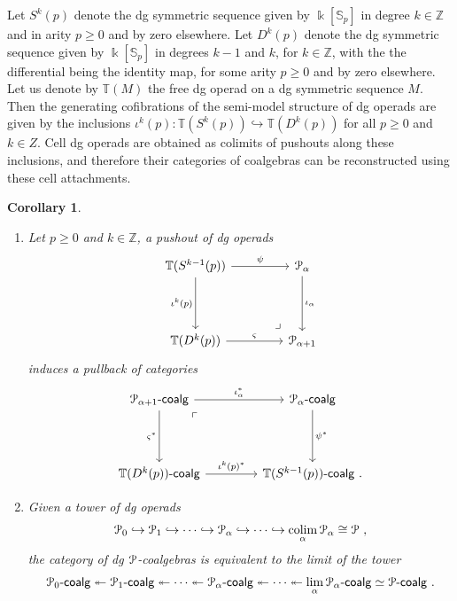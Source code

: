 \documentclass{proc-l}
\renewcommand{\mathcal}{\EuScript}
\DeclareMathOperator*{\colim}{colim}
\newcommand{\oneop}{\mathcal{P}}
\newcommand{\onecoalg}[1]{#1\text{-}\mathsf{coalg}}
\newcommand{\onepcoalg}{\mathcal{P}\text{-}\mathsf{coalg}}
\theoremstyle{plain}
\newtheorem{corollary}[{theorem}]{Corollary}
\theoremstyle{definition}
\theoremstyle{remark}
\newcommand{\kk}{\Bbbk}
\begin{document}
Let $S^{k}(p)$ denote the dg symmetric sequence given by $\kk[\mathbb{S}_p]$ in degree $k \in \mathbb{Z}$ and in arity $p \geq 0$ and by zero elsewhere. Let $D^k(p)$ denote the dg symmetric sequence given by $\kk[\mathbb{S}_p]$ in degrees $k-1$ and $k$, for $k \in \mathbb{Z}$, with the the differential being the identity map, for some arity $p \geq 0$ and by zero elsewhere. Let us denote by $\mathbb{T}(M)$ the free dg operad on a dg symmetric sequence $M$. Then the generating cofibrations of the semi-model structure of dg operads are given by the inclusions $\iota^k(p): \mathbb{T}(S^{k}(p)) \hookrightarrow \mathbb{T}(D^k(p))$ for all $p \geq 0$ and $k \in Z$. Cell dg operads are obtained as colimits of pushouts along these inclusions, and therefore their categories of coalgebras can be reconstructed using these cell attachments.

\begin{corollary}%
\label{Corollary:2.17}\label{corollary: devissage along cells of 1-categories of P-coalgebras}\leavevmode
\begin{enumerate}
\item Let $p \geq 0$ and $k \in \mathbb{Z}$, a pushout of dg operads
\[
\begin{tikzcd}[column sep=3.5pc,row sep=3.5pc]
\mathbb{T}(S^{k-1}(p)) \arrow[r,"\psi"] \arrow[d,"\iota^k(p)",swap]  \arrow[dr, phantom,"\ulcorner" rotate=-180, very near end]
&\oneop_\alpha \arrow[d,"\iota_\alpha"]  \\
\mathbb{T}(D^k(p)) \arrow[r,"\varsigma"]
&\oneop_{\alpha + 1}
\end{tikzcd}
\]
induces a pullback of categories
\[
\begin{tikzcd}[column sep=3.5pc,row sep=3.5pc]
\onecoalg{\oneop_{\alpha + 1}} \arrow[r,"\iota_\alpha^*"] \arrow[d,"\varsigma^*",swap] \arrow[dr, phantom, "\ulcorner", very near start]
&\onecoalg{\oneop_\alpha} \arrow[d,"\psi^*"]  \\
\onecoalg{\mathbb{T}(D^k(p))} \arrow[r,"\iota^k(p)^*"]
&\onecoalg{\mathbb{T}(S^{k-1}(p))}~.
\end{tikzcd}
\]

\item Given a tower of dg operads
\[
\oneop_0 \hookrightarrow \oneop_1 \hookrightarrow \cdots \hookrightarrow \oneop_\alpha \hookrightarrow \cdots \hookrightarrow \colim_{\alpha} \oneop_\alpha \cong \oneop~,
\]
the category of dg $\oneop$-coalgebras is equivalent to the limit of the tower
\[
\onecoalg{\oneop_0} \twoheadleftarrow \onecoalg{\oneop_1} \twoheadleftarrow \cdots \twoheadleftarrow \onecoalg{\oneop_\alpha} \twoheadleftarrow  \cdots \twoheadleftarrow \lim_{\alpha} \onecoalg{\oneop_\alpha} \simeq \onepcoalg~.
\]
\end{enumerate}
\end{corollary}
\end{document}
